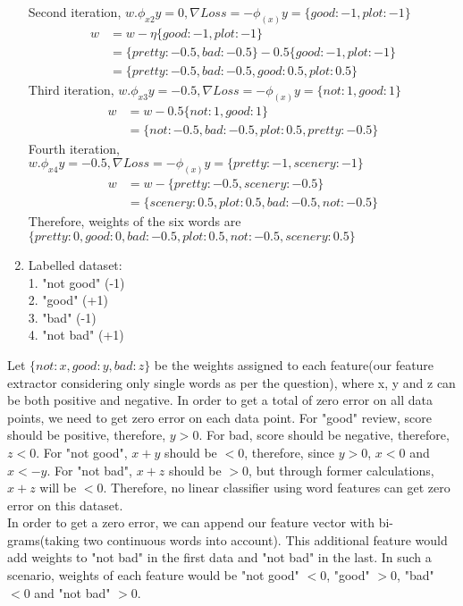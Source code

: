 \documentclass[12pt]{article}
\begin{document}
\begin{enumerate}[label=(\alph*)]
Second iteration, $w.\phi_{x2}y = 0, \nabla Loss = -\phi_{(x)}y = \{ good: -1, plot: -1 \}$
\begin{align*}
w &= w - \eta \{ good: -1, plot: -1\} \\
&= \{pretty: -0.5, bad: -0.5\} - 0.5 \{good: -1, plot: -1\} \\
&= \{ pretty: -0.5, bad: -0.5, good: 0.5, plot: 0.5 \}
\end{align*}
Third iteration, $w.\phi_{x3}y = -0.5, \nabla Loss = -\phi_{(x)}y = \{not: 1, good: 1\}$
\begin{align*}
w &= w - 0.5 \{not: 1, good: 1\} \\
&= \{not: -0.5, bad: -0.5, plot: 0.5, pretty: -0.5\}
\end{align*}
Fourth iteration, $w.\phi_{x4}y = -0.5, \nabla Loss = -\phi_{(x)}y = \{pretty: -1, scenery: -1\}$
\begin{align*}
w &= w - \{pretty: -0.5, scenery: -0.5\} \\
&= \{scenery: 0.5, plot: 0.5, bad: -0.5, not: -0.5\}
\end{align*}
Therefore, weights of the six words are $\{pretty: 0, good: 0, bad: -0.5, plot: 0.5, not: -0.5, scenery: 0.5\}$
  \item Labelled dataset: \\
1. "not good" (-1) \\
2. "good" (+1) \\
3. "bad" (-1) \\
4. "not bad" (+1) \\  
\end{enumerate}
Let ${\{not: x, good: y, bad: z\}}$ be the weights assigned to each feature(our feature extractor considering only single words as per the question), where x, y and z can be both positive and negative. In order to get a total of zero error on all data points, we need to get zero error on each data point. For "good" review, score should be positive, therefore, $y > 0$. For bad, score should be negative, therefore, $z < 0$. For "not good", $x + y$ should be $< 0$, therefore, since $y > 0$, $x < 0$ and $x < -y$. For "not bad", $x + z$ should be $> 0$, but through former calculations, $x + z$ will be $< 0$. Therefore, no linear classifier using word features can get zero error on this dataset. \\

In order to get a zero error, we can append our feature vector with bi-grams(taking two continuous words into account). This additional feature would add weights to "not bad" in the first data and "not bad" in the last. In such a scenario, weights of each feature would be "not good" $< 0$, "good" $> 0$, "bad" $< 0$ and "not bad" $> 0$.
\end{document}
